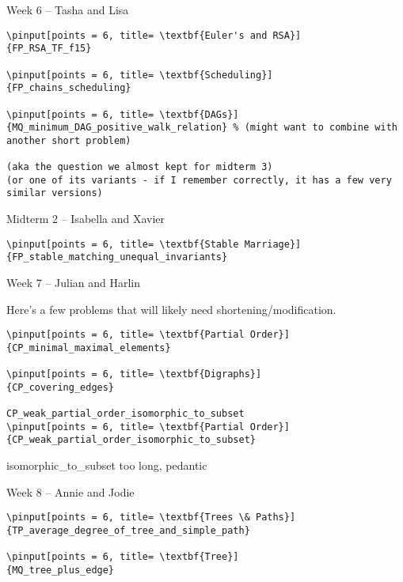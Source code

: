 \documentclass[quiz]{mcs}
\begin{document}
\begin{staffnotes}
\begin{center}
{\large Week 6 -- Tasha and Lisa}
\end{center}

\begin{verbatim}
\pinput[points = 6, title= \textbf{Euler's and RSA}]
{FP_RSA_TF_f15}

\pinput[points = 6, title= \textbf{Scheduling}]
{FP_chains_scheduling}

\pinput[points = 6, title= \textbf{DAGs}]
{MQ_minimum_DAG_positive_walk_relation} % (might want to combine with another short problem)

(aka the question we almost kept for midterm 3)
(or one of its variants - if I remember correctly, it has a few very similar versions)

\end{verbatim}

\begin{center}
{\large Midterm 2 -- Isabella and Xavier}
\end{center}

\begin{verbatim}
\pinput[points = 6, title= \textbf{Stable Marriage}]
{FP_stable_matching_unequal_invariants}

\end{verbatim}

\begin{center}
{\large Week 7 -- Julian and Harlin}
\end{center}
Here's a few problems that will likely need shortening/modification.

\begin{verbatim}
\pinput[points = 6, title= \textbf{Partial Order}]
{CP_minimal_maximal_elements}

\pinput[points = 6, title= \textbf{Digraphs}]
{CP_covering_edges}

CP_weak_partial_order_isomorphic_to_subset
\pinput[points = 6, title= \textbf{Partial Order}]
{CP_weak_partial_order_isomorphic_to_subset}
\end{verbatim}
isomorphic\_to\_subset too long, pedantic

\begin{center}
{\large Week 8 -- Annie and Jodie}
\end{center}
\begin{verbatim}
\pinput[points = 6, title= \textbf{Trees \& Paths}]
{TP_average_degree_of_tree_and_simple_path}

\pinput[points = 6, title= \textbf{Tree}]
{MQ_tree_plus_edge}


\end{verbatim}
\end{staffnotes}
\end{document}
